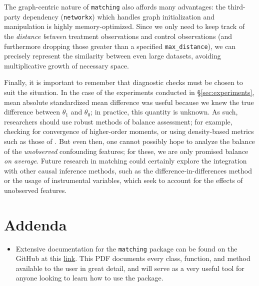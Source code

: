 \documentclass[11pt]{extarticle}
\begin{document}
The graph-centric nature of \texttt{matching} also affords many advantages: the third-party dependency (\texttt{networkx}) which handles graph initialization and manipulation is highly memory-optimized.
Since we only need to keep track of the \emph{distance between} treatment observations and control observations (and furthermore dropping those greater than a specified \texttt{max\_distance}), we can precisely represent the similarity between even large datasets, avoiding multiplicative growth of necessary space.

Finally, it is important to remember that diagnostic checks must be chosen to suit the situation. In the case of the experiments conducted in \S\ref{sec:experiments}, mean absolute standardized mean difference was useful because we knew the true difference between $\theta_1$ and $\theta_0$; in practice, this quantity is unknown. As such, researchers should use robust methods of balance assessment; for example, checking for convergence of higher-order moments, or using density-based metrics such as those of \textcite{zhu_kernel-based_2018}. But even then, one cannot possibly hope to analyze the balance of the \emph{unobserved} confounding features; for these, we are only promised balance \emph{on average}. Future research in matching could certainly explore the integration with other causal inference methods, such as the difference-in-differences method or the usage of instrumental variables, which seek to account for the effects of unobserved features.


\cleardoublepage
\section*{Addenda}

\begin{itemize}
  \item Extensive documentation for the \texttt{matching} package can be found on the GitHub at this \href{https://github.com/jackpotrykus/propensity-score-matching-thesis/blob/d47cd58ae7c6cd3fc8a5afc940212e2674d6e7ba/docs/matching.pdf}{link}. This PDF documents every class, function, and method available to the user in great detail, and will serve as a very useful tool for anyone looking to learn how to use the package.
\end{itemize}



\cleardoublepage
{}
{}
\printbibliography
\end{document}
